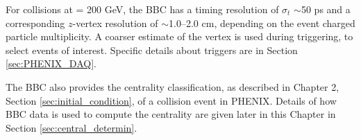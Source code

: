 For \pau collisions at \sqsn = 200 GeV, the BBC has a timing resolution of $\sigma_t$ $\sim$50 ps and a corresponding $z$-vertex resolution of $\sim$1.0--2.0 cm, depending on the event charged particle multiplicity. A coarser estimate of the vertex is used during triggering, to select events of interest. Specific details about triggers are in Section \ref{sec:PHENIX_DAQ}.

The BBC also provides the centrality classification, as described in Chapter 2, Section \ref{sec:initial_condition}, of a collision event in PHENIX. Details of how BBC data is used to compute the centrality are given later in this Chapter in Section \ref{sec:central_determin}.

